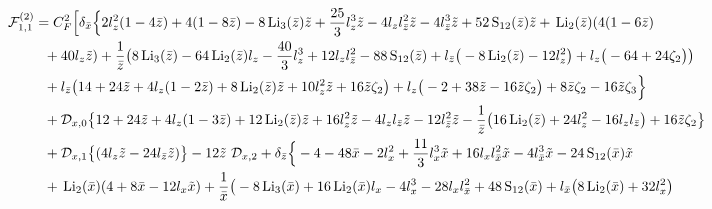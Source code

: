 % 
% 
% 
\begin{align}
% 
{\cal F}_{1,1}^{(2)} &= C_F^2 \Big[
% 
 \delta_{\bar{x}} \Big\{
        2 \logz^2 (1 - 4\zb)
        +4  (1 - 8\zb)
        -8 \lithzbar \zt
        +\frac{25}{3}  \logz^3 \zt
        -4 \logz \logzbar^2 \zt
        -4 \logzbar^3 \zt
        +52 \sotzbar \zt
        +\litwzbar (4  (1 - 6\zb)
\nn\\& ~~  
        +40 \logz \zt
        )
        +\iomz \big(
                8 \lithzbar
                -64 \litwzbar \logz
                -\frac{40}{3}  \logz^3
                +12 \logz \logzbar^2
                -88 \sotzbar
                +\logzbar \big(
                        -8 \litwzbar
                        -12 \logz^2
                \big)
                +\logz \big(
                        -64
                        +24 \zeta_2
                \big)
        \big)
\nn\\& ~~
        +\logzbar \big(
                14
                +24 \zt
                +4 \logz  (1 - 2\zb)
                +8 \litwzbar \zt
                +10 \logz^2 \zt
                +16 \zt \zeta_2
        \big)
        +\logz \big(
                -2
                +38 \zt
                -16 \zt \zeta_2
        \big)
        +8 \zb \zeta_2
        -16 \zt \zeta_3
\Big\}
\nn\\& ~~
% 
+ {\mathcal{D}_{x,0}}  \big\{
        12
        +24 \zt
        +4 \logz   (1 - 3\zb)
        +12 \litwzbar \zt
        +16 \logz^2 \zt
        -4 \logz \logzbar \zt
        -12 \logzbar^2 \zt
        -\iomz \big(
                 16 \litwzbar
                +24 \logz^2
                -16 \logz \logzbar
        \big)
        +16 \zt \zeta_2
\big\}
\nn\\& ~~
% 
+ {\mathcal{D}_{x,1}}  \big\{ (4 \logz \zt
-24 \logzbar \zt ) 
\big\}
% 
-12 \zt ~ {\mathcal{D}_{x,2}}
% 
% 
+\delta_{\bar{z}} \Big\{
        -4
        -48 \xb
        -2 \logx^2
        +\frac{11}{3}  \logx^3 \xt
        +16 \logx \logxbar^2 \xt
        -4 \logxbar^3 \xt
        -24 \sotxbar \xt
\nn\\& ~~        
        +\litwxbar (4 + 8 \xb
        -12 \logx \xt
        )
        +\iomx \big(
                -8 \lithxbar
                +16 \litwxbar \logx
                -4 \logx^3
                -28 \logx \logxbar^2
                +48 \sotxbar
                +\logxbar \big(
                        8 \litwxbar
                        +32 \logx^2
                \big)
\nn\\& ~~                

\end{align}
